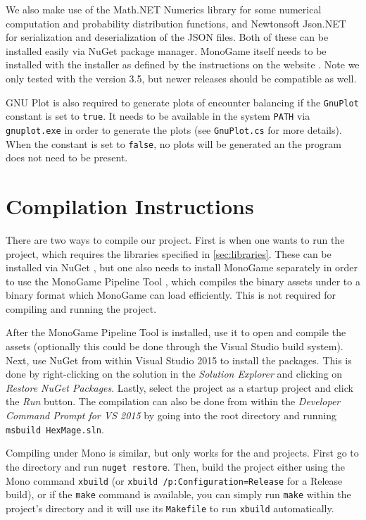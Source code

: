 We also make use of the Math.NET Numerics \citep{math-dotnet} library for some numerical computation and probability distribution functions, and Newtonsoft Json.NET \citep{json-dotnet} for serialization and deserialization of the JSON files. Both of these can be installed easily via NuGet \citep{nuget} package manager. MonoGame itself needs to be installed with the installer as defined by the instructions on the website \citep{monogame}. Note we only tested with the version 3.5, but newer releases should be compatible as well.

GNU Plot \citep{gnuplot} is also required to generate plots of encounter balancing if the \verb|GnuPlot| constant is set to \verb|true|. It needs to be available in the system \verb|PATH| via \verb|gnuplot.exe| in order to generate the plots (see \verb|GnuPlot.cs| for more details). When the constant is set to \verb|false|, no plots will be generated an the program does not need to be present.

\section{Compilation Instructions}
\label{sec:compilation}

There are two ways to compile our project. First is when one wants to run the  project, which requires the libraries specified in \autoref{sec:libraries}. These can be installed via NuGet \citep{nuget}, but one also needs to install MonoGame separately in order to use the MonoGame Pipeline Tool \citep{monogame-pipeline}, which compiles the binary assets under  to a binary format which MonoGame can load efficiently. This is not required for compiling and running the  project.

After the MonoGame Pipeline Tool is installed, use it to open  and compile the assets (optionally this could be done through the Visual Studio build system). Next, use NuGet from within Visual Studio 2015 to install the packages. This is done by right-clicking on the  solution in the \emph{Solution Explorer} and clicking on \emph{Restore NuGet Packages}. Lastly, select the  project as a startup project and click the \emph{Run} button. The compilation can also be done from within the \emph{Developer Command Prompt for VS 2015} by going into the root  directory and running \verb|msbuild HexMage.sln|.

Compiling under Mono is similar, but only works for the  and  projects. First go to the  directory and run \verb|nuget restore|. Then, build the project either using the Mono command \verb|xbuild| (or \verb|xbuild /p:Configuration=Release| for a Release build), or if the \verb|make| command is available, you can simply run \verb|make| within the project's directory and it will use its \verb|Makefile| to run \verb|xbuild| automatically.

